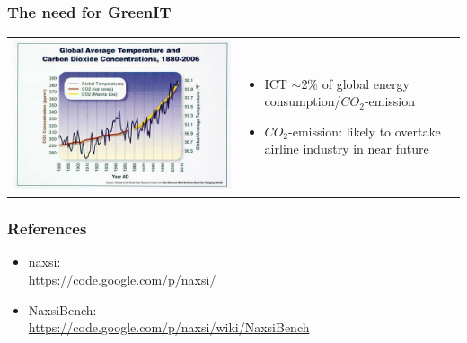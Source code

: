 \documentclass[11pt]{beamer}
\begin{document}
\begin{frame}
  \frametitle{The need for GreenIT}
\begin{tabular}{ll}
\begin{minipage}[c]{0.3\textwidth}
\includegraphics[width=\textwidth]{images/co2temp.jpg}
\end{minipage}
&
\begin{minipage}[c]{0.7\textwidth}
  \begin{itemize}
   \item ICT $\sim$2\% of global energy consumption/$CO_2$-emission
   \item $CO_2$-emission: likely to overtake airline industry in near future
  \end{itemize}
\end{minipage}
\end{tabular}
\end{frame}

\begin{frame}[noframenumbering]
  \frametitle<presentation>{References}
  \begin{itemize}
   \item naxsi: \\ \url{https://code.google.com/p/naxsi/}
   \item NaxsiBench: \\ \url{https://code.google.com/p/naxsi/wiki/NaxsiBench}
  \end{itemize}
\end{frame}
\end{document}
